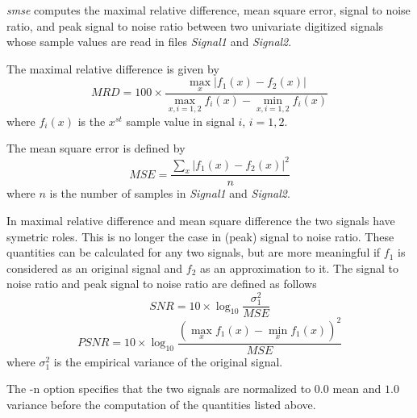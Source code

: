 {\em smse} computes the maximal relative difference, mean square error, signal to noise ratio, and peak signal to noise ratio between two univariate digitized signals whose sample values are read in files {\em Signal1} and {\em Signal2}. 

The maximal relative difference is given by 
\[
MRD = 100 \times \frac{\max_{x}|f_{1}(x) - f_{2}(x)|}{\max_{x,i=1,2}f_{i}(x) - \min_{x,i=1,2}f_{i}(x)}
\]
where $f_{i}(x)$ is the $x^{st}$ sample value in signal $i$, $i=1,2$. 

The mean square error is defined by 
\[
MSE = \frac{\sum_{x}|f_{1}(x) - f_{2}(x)|^{2}}{n}
\]
where $n$ is the number of samples in {\em Signal1} and {\em Signal2}.

In maximal relative difference and mean square difference the two signals have symetric roles. This is no longer the case in (peak) signal to noise ratio. 
These quantities can be calculated for any two signals, but are more meaningful if $f_{1}$ is considered as an original signal and $f_{2}$ as an approximation to it. The signal to noise ratio and peak signal to noise ratio are defined as follows
\[
SNR = 10 \times \log_{10} \frac{\sigma_{1}^{2}}{MSE} 
\]
\[
PSNR = 10 \times \log_{10} \frac{(\max_{x} f_{1}(x) - \min_{x} f_{1}(x))^{2}}{MSE}
\]
where $\sigma_{1}^{2}$ is the empirical variance of the original signal.

The -n option specifies that the two signals are normalized to $0.0$ mean and $1.0$ variance before the computation of the quantities listed above.






